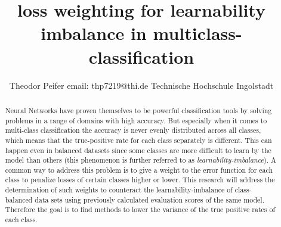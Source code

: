 \documentclass[journal]{IEEEtran}
\begin{document}
\title{\textbf{loss weighting for learnability imbalance in multiclass-classification}}



\author{Theodor Peifer
        \linebreak
        email: thp7219@thi.de
        \linebreak
        Technische Hochschule Ingolstadt
}



\maketitle


\begin{abstract}
Neural Networks have proven themselves to be powerful classification 
tools by solving problems in a range of domains with high accuracy. 
But especially when it comes to multi-class classification the accuracy is never evenly distributed across all classes, which means that the true-positive rate for each class separately is different.
This can happen even in balanced datasets since some classes are more difficult to learn by the model than others (this phenomenon is further referred to as \emph{learnability-imbalance}).
A common way to address this problem is to give a weight to the error function for each class to penalize losses of certain classes higher or lower.
This research will address the determination of such weights to counteract the learnability-imbalance of class-balanced data sets using previously calculated evaluation scores of the same model.
Therefore the goal is to find methods to lower the variance of the true positive rates of each class.
\end{abstract}
\end{document}
